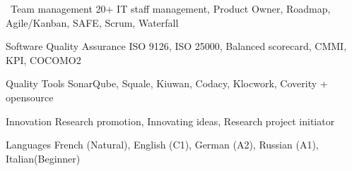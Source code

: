 \begin{cvskills}



  \cvskill
  {\faUsers\ Team management} %
  {20+ IT staff management, Product Owner, Roadmap, Agile/Kanban, SAFE, Scrum, Waterfall} %


  \cvskill
  {Software Quality Assurance} %
  {ISO 9126, ISO 25000, Balanced scorecard, CMMI, KPI, COCOMO2} %

  \cvskill
  {Quality Tools} %
  {SonarQube, Squale, Kiuwan, Codacy, Klocwork, Coverity + opensource} %


  \cvskill
  {Innovation} %
  {Research promotion, Innovating ideas, Research project initiator} %

  \cvskill
  { Languages} %
  {French (Natural), English (C1), German (A2), Russian (A1), Italian(Beginner)} %

  \end{cvskills}
